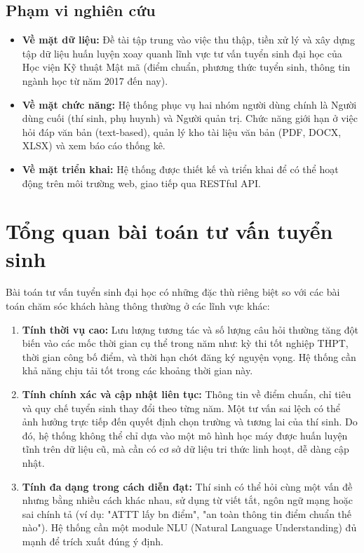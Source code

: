 \subsection{Phạm vi nghiên cứu}
\begin{itemize}
    \item \textbf{Về mặt dữ liệu:} Đề tài tập trung vào việc thu thập, tiền xử lý và xây dựng tập dữ liệu huấn luyện xoay quanh lĩnh vực tư vấn tuyển sinh đại học của Học viện Kỹ thuật Mật mã (điểm chuẩn, phương thức tuyển sinh, thông tin ngành học từ năm 2017 đến nay).
    \item \textbf{Về mặt chức năng:} Hệ thống phục vụ hai nhóm người dùng chính là Người dùng cuối (thí sinh, phụ huynh) và Người quản trị. Chức năng giới hạn ở việc hỏi đáp văn bản (text-based), quản lý kho tài liệu văn bản (PDF, DOCX, XLSX) và xem báo cáo thống kê.
    \item \textbf{Về mặt triển khai:} Hệ thống được thiết kế và triển khai để có thể hoạt động trên môi trường web, giao tiếp qua RESTful API.
\end{itemize}

\section{Tổng quan bài toán tư vấn tuyển sinh}
Bài toán tư vấn tuyển sinh đại học có những đặc thù riêng biệt so với các bài toán chăm sóc khách hàng thông thường ở các lĩnh vực khác:

\begin{enumerate}
    \item \textbf{Tính thời vụ cao:} Lưu lượng tương tác và số lượng câu hỏi thường tăng đột biến vào các mốc thời gian cụ thể trong năm như: kỳ thi tốt nghiệp THPT, thời gian công bố điểm, và thời hạn chót đăng ký nguyện vọng. Hệ thống cần khả năng chịu tải tốt trong các khoảng thời gian này.
    \item \textbf{Tính chính xác và cập nhật liên tục:} Thông tin về điểm chuẩn, chỉ tiêu và quy chế tuyển sinh thay đổi theo từng năm. Một tư vấn sai lệch có thể ảnh hưởng trực tiếp đến quyết định chọn trường và tương lai của thí sinh. Do đó, hệ thống không thể chỉ dựa vào một mô hình học máy được huấn luyện tĩnh trên dữ liệu cũ, mà cần có cơ sở dữ liệu tri thức linh hoạt, dễ dàng cập nhật.
    \item \textbf{Tính đa dạng trong cách diễn đạt:} Thí sinh có thể hỏi cùng một vấn đề nhưng bằng nhiều cách khác nhau, sử dụng từ viết tắt, ngôn ngữ mạng hoặc sai chính tả (ví dụ: "ATTT lấy bn điểm", "an toàn thông tin điểm chuẩn thế nào"). Hệ thống cần một module NLU (Natural Language Understanding) đủ mạnh để trích xuất đúng ý định.
\end{enumerate}

